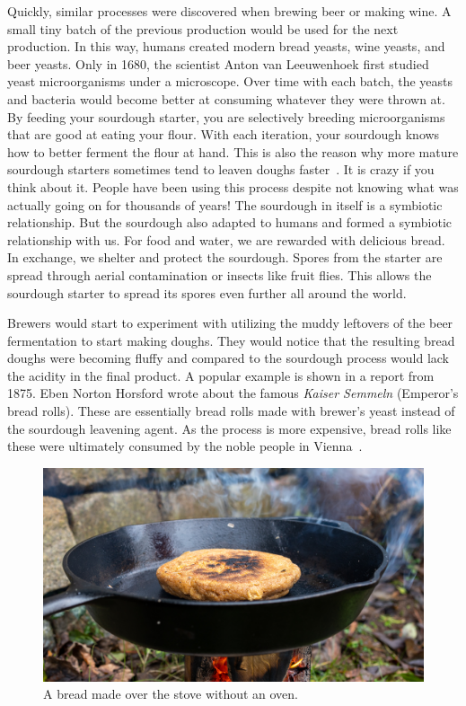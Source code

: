Quickly, similar processes were discovered when brewing beer
or making wine. A small tiny batch of the previous production
would be used for the next production. In this way, humans created
modern bread yeasts, wine yeasts, and beer yeasts. Only in 1680,
the scientist Anton van Leeuwenhoek first studied yeast microorganisms
under a microscope. Over time with each batch, the yeasts and bacteria
would become better at consuming whatever they were thrown at.
By feeding your sourdough starter, you are selectively breeding
microorganisms that are good at eating your flour. With
each iteration, your sourdough knows how to better ferment the flour
at hand. This is also the reason why more mature sourdough starters sometimes
tend to leaven doughs faster~\cite{review+of+sourdough+starters}. It is crazy if you
think about it. People have been using this process despite not
knowing what was actually going on for thousands of years! The
sourdough in itself is a symbiotic relationship. But the sourdough
also adapted to humans and formed a symbiotic relationship with us.
For food and water, we are rewarded with delicious bread. In exchange,
we shelter and protect the sourdough. Spores from the starter
are spread through aerial contamination or insects like fruit flies.
This allows the sourdough starter to spread its spores even
further all around the world. 

Brewers would start to experiment with utilizing the muddy leftovers
of the beer fermentation to start making doughs. They would notice
that the resulting bread doughs were becoming fluffy and compared
to the sourdough process would lack the acidity in the final product.
A popular example is shown in a report from 1875. Eben Norton Horsford
wrote about the famous \emph{Kaiser Semmeln} (Emperor's bread rolls).
These are essentially bread rolls made with brewer's yeast instead
of the sourdough leavening agent. As the process is more expensive,
bread rolls like these were ultimately consumed by the noble people
in Vienna~\cite{vienna+breadrolls}.

\begin{figure}[ht]
  \includegraphics[width=\textwidth]{sourdough-stove}
  \caption{A bread made over the stove without an oven.}%
  \label{sourdough-stove}
\end{figure}

